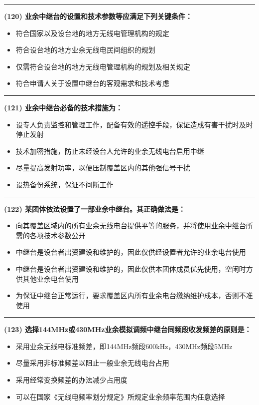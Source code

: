 \documentclass[twocolumn]{ctexart}  %
\begin{document}
\noindent\rule{0.5\textwidth}{1pt}
\heiti \textbf{(120) 业余中继台的设置和技术参数等应满足下列关键条件：} \songti {\color{gray} [LK0034] }
\begin{itemize}
	\item  符合国家以及设台地的地方无线电管理机构的规定
	\item  符合设台地的地方业余无线电民间组织的规划
	\item  仅需符合设台地的地方无线电管理机构的规划及相关规定
	\item  符合申请人关于设置中继台的客观需求和技术考虑
\end{itemize}


\noindent\rule{0.5\textwidth}{1pt}
\heiti \textbf{(121) 业余中继台必备的技术措施为：} \songti {\color{gray} [LK0035] }
\begin{itemize}
	\item  设专人负责监控和管理工作，配备有效的遥控手段，保证造成有害干扰时及时停止发射
	\item  技术加密措施，防止未经设台人允许的业余无线电台启用中继
	\item  尽量提高发射功率，以便压制覆盖区内的其他强信号干扰
	\item  设热备份系统，保证不间断工作
\end{itemize}


\noindent\rule{0.5\textwidth}{1pt}
\heiti \textbf{(122) 某团体依法设置了一部业余中继台。其正确做法是：} \songti {\color{gray} [LK0036] }
\begin{itemize}
	\item  向其覆盖区域内的所有业余无线电台提供平等的服务，并将使用业余中继台所需的各项技术参数公开
	\item  中继台是设台者出资建设和维护的，因此仅供经设置者允许的业余电台使用
	\item  中继台是设台者出资建设和维护的，因此仅供本团体成员优先使用，空闲时方供其他业余电台使用
	\item  为保证中继台正常运行，要求覆盖区内所有业余电台缴纳维护成本，否则不准使用
\end{itemize}


\noindent\rule{0.5\textwidth}{1pt}
\heiti \textbf{(123) 选择144MHz或430MHz业余模拟调频中继台同频段收发频差的原则是：} \songti {\color{gray} [LK0037] }
\begin{itemize}
	\item  采用业余无线电标准频差，即144MHz频段600kHz，430MHz频段5MHz
	\item  尽量采用非标准频差以阻止一般业余无线电台占用
	\item  采用经常变换频差的办法减少占用度
	\item  可以在国家《无线电频率划分规定》所规定业余频率范围内任意选择
\end{itemize}
\end{document}

